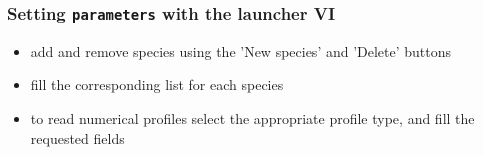 \documentclass[10pt]{beamer}
\begin{document}
{
\begin{frame}[fragile]
  \frametitle{Setting {\tt parameters} with the launcher VI}

\vspace{5.25cm}

\begin{block}{}
\begin{itemize}
\item add and remove species using the 'New species' and 'Delete' buttons
\item fill the corresponding list for each species
\item to read numerical profiles select the appropriate profile type, and fill the requested fields
\end{itemize}
\end{block}

\end{frame}
}

\end{document}
